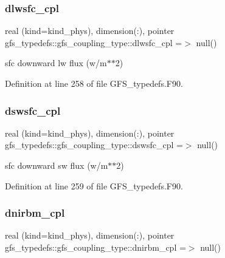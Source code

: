 \mbox{\label{structgfs__typedefs_1_1gfs__coupling__type_a50f01bebb9c7aa12e91cc91c6eee137d}} 
\subsubsection{dlwsfc\+\_\+cpl}
{\footnotesize\ttfamily real (kind=kind\+\_\+phys), dimension(\+:), pointer gfs\+\_\+typedefs\+::gfs\+\_\+coupling\+\_\+type\+::dlwsfc\+\_\+cpl =$>$ null()}



sfc downward lw flux (w/m$\ast$$\ast$2) 



Definition at line 258 of file G\+F\+S\+\_\+typedefs.\+F90.

\mbox{\label{structgfs__typedefs_1_1gfs__coupling__type_a9911574e6652224c9a4d69e7af9790ff}} 
\subsubsection{dswsfc\+\_\+cpl}
{\footnotesize\ttfamily real (kind=kind\+\_\+phys), dimension(\+:), pointer gfs\+\_\+typedefs\+::gfs\+\_\+coupling\+\_\+type\+::dswsfc\+\_\+cpl =$>$ null()}



sfc downward sw flux (w/m$\ast$$\ast$2) 



Definition at line 259 of file G\+F\+S\+\_\+typedefs.\+F90.

\mbox{\label{structgfs__typedefs_1_1gfs__coupling__type_a728219ef437f9bbc47ffb2558e64e129}} 
\subsubsection{dnirbm\+\_\+cpl}
{\footnotesize\ttfamily real (kind=kind\+\_\+phys), dimension(\+:), pointer gfs\+\_\+typedefs\+::gfs\+\_\+coupling\+\_\+type\+::dnirbm\+\_\+cpl =$>$ null()}



